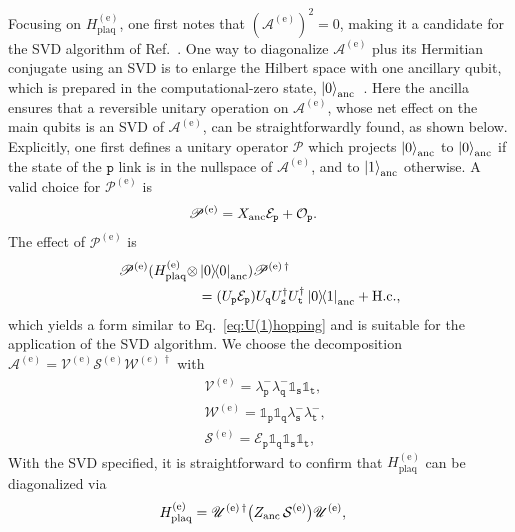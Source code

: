 \documentclass[aps,prd,twocolumn,showpacs,groupedaddress,superscriptaddress,nofootinbib,floatfix,preprintnumbers,longbibliography]{revtex4-1}
\begin{document}
Focusing on $H_{\mathrm{plaq}}^{(\text{e})}$, one first notes that $(\mathscr{A}^{(\text{e})})^2 = 0$, making it a candidate for the SVD algorithm of Ref.~\cite{Davoudi:2022xmb}. One way to diagonalize $\mathscr{A}^{(\text{e})}$ plus its Hermitian conjugate using an SVD is to enlarge the Hilbert space with one ancillary qubit, which is prepared in the computational-zero state, $\ket{0}_{\rm anc}$~\cite{Davoudi:2022xmb}. Here the ancilla ensures that a reversible unitary operation on $\mathscr{A}^{(\text{e})}$, whose net effect on the main qubits is an SVD of $\mathscr{A}^{(\text{e})}$, can be straightforwardly found, as shown below. Explicitly, one first defines a unitary operator $\mathscr{P}$ which projects $\ket{0}_\text{anc}$ to $\ket{0}_\text{anc}$ if the state of the $\mathtt{p}$ link is in the nullspace of $\mathscr{A}^{(\text{e})}$, and to $\ket{1}_\text{anc}$ otherwise. A valid choice for $\mathscr{P}^{(\text{e})}$ is
%
\begin{align}
    \mathscr{P}^{(\text{e})} &= X_{\rm anc}\mathcal{E}_\mathtt{p} + \mathcal{O}_\mathtt{p} .
\end{align}
%
The effect of $\mathscr{P}^{(\text{e})}$ is
%
\begin{align}
    \mathscr{P}^{(\text{e})} ( H_{\mathrm{plaq}}^{(\text{e})} \otimes & \ket{0}\!\!\bra{0}_{\rm anc} ) \mathscr{P}^{{(\text{e})}\,\dagger} 
    \nonumber\\
    &= ( U_\mathtt{p} \mathcal{E}_\mathtt{p}) U_\mathtt{q} U_\mathtt{s}^\dagger U_\mathtt{t}^\dagger \ket{0}\!\!\bra{1}_{\rm anc}
    + \mathrm{H.c.},
\end{align}
%
which yields a form similar to Eq.~\eqref{eq:U(1)hopping} and is suitable for the application of the SVD algorithm. We choose the decomposition $\mathscr{A}^{(\text{e})} = \mathscr{V}^{(\text{e})} \mathcal{S}^{(\text{e})} \mathscr{W}^{{(e)}\,\dagger}$ with
%
\begin{align}
    & \mathscr{V}^{(\text{e})} = \lambda^{-}_\mathtt{p} \lambda^{-}_\mathtt{q} \mathds{1}_\mathtt{s} \mathds{1}_\mathtt{t},\\
    & \mathscr{W}^{(\text{e})} = \mathds{1}_\mathtt{p} \mathds{1}_\mathtt{q} \lambda^{-}_\mathtt{s} \lambda^{-}_\mathtt{t}, \\
    & \mathcal{S}^{(\text{e})} = \mathcal{E}_\mathtt{p} \mathds{1}_\mathtt{q} \mathds{1}_\mathtt{s} \mathds{1}_\mathtt{t},
\end{align}
%
With the SVD specified, it is straightforward to confirm that $H_{\mathrm{plaq}}^{(\text{e})}$ can be diagonalized via
%
\begin{align}
    & H_{\mathrm{plaq}}^{(\text{e})} = \mathscr{U}^{(\text{e})\,\dagger}
    \big(Z_{\rm anc} \, \mathcal{S}^{(\text{e})} \big)\mathscr{U}^{(\text{e})},
\end{align}
\end{document}
